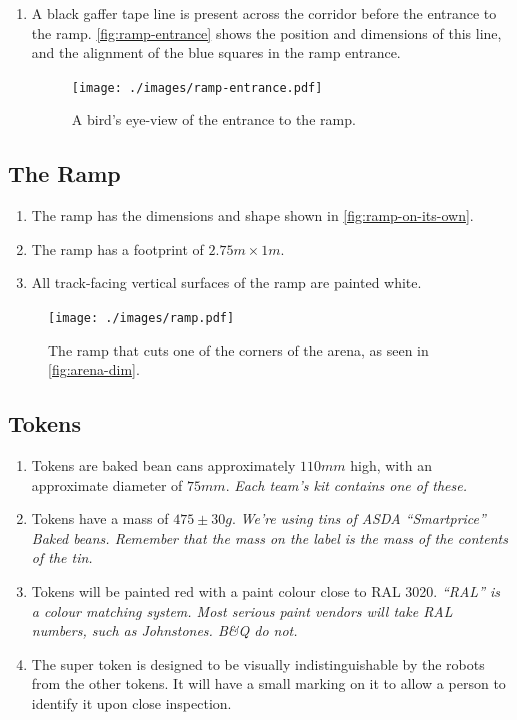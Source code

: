 \begin{enumerate}
\item A black gaffer tape line is present across the corridor before the entrance to the ramp.  \autoref{fig:ramp-entrance} shows the position and dimensions of this line, and the alignment of the blue squares in the ramp entrance.

  \begin{figure}
    \begin{center}
    \texttt{[image: ./images/ramp-entrance.pdf]}
    \end{center}
    \caption{\label{fig:ramp-entrance}A bird's eye-view of the entrance to the ramp.}
  \end{figure}


\end{enumerate}

\subsection{The Ramp}
\label{sub:Ramp}
\begin {enumerate}
\item The ramp has the dimensions and shape shown in \autoref{fig:ramp-on-its-own}.
\item The ramp has a footprint of $2.75m \times 1m$.
\item All track-facing vertical surfaces of the ramp are painted white.
\end {enumerate}

\begin{figure}
  \begin{center}
    \texttt{[image: ./images/ramp.pdf]}
  \end{center}
  \caption{\label{fig:ramp-on-its-own}The ramp that cuts one of the corners of the arena, as seen in \autoref{fig:arena-dim}.}
\end{figure}

\subsection{Tokens}
\label{sub:Tokens}
\begin {enumerate}
\item Tokens are baked bean cans approximately $110mm$ high, with an approximate diameter of $75mm$.
\emph{Each team's kit contains one of these.}
\item Tokens have a mass of $475\pm30g$.  \emph{We're using tins of ASDA ``Smartprice'' Baked beans.  Remember that the mass on the label is the mass of the contents of the tin.}
\item Tokens will be painted red with a paint colour close to RAL 3020.  \emph{``RAL'' is  a colour matching system.  Most serious paint vendors will take RAL numbers, such as Johnstones.  B\&Q do not.}

\item The super token is designed to be visually indistinguishable by the robots from the other tokens.  It will have a small marking on it to allow a person to identify it upon close inspection.
\end {enumerate}

